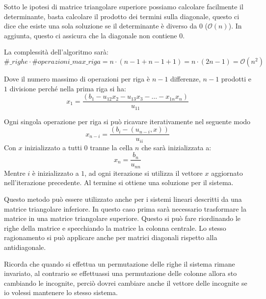 Sotto le ipotesi di matrice triangolare superiore possiamo calcolare facilmente
il determinante, basta calcolare il prodotto dei termini sulla diagonale, questo
ci dice che esiste una sola soluzione se il determinante è diverso da $0$
($\mathcal{O}(n)$). In aggiunta, questo ci assicura che la diagonale non contiene $0$.

La complessità dell'algoritmo sarà:
\begin{equation*}
    \#\_righe \cdot \#operazioni\_max\_riga = n \cdot (n - 1 + n - 1 + 1) = n
    \cdot (2n - 1) = \mathcal{O}(n^2)
\end{equation*}
\begin{nota}
    Dove il numero massimo di operazioni per riga è $n - 1$ differenze, $n - 1$
    prodotti e $1$ divisione perché nella prima riga si ha:
    \begin{equation*}
        x_1 = \frac{(b_1 - u_{12} x_2 - u_{13}x_3 - \dots - x_{1n} x_n)}{u_{11}}
    \end{equation*}
\end{nota}
Ogni singola operazione per riga si può ricavare iterativamente nel seguente modo
\begin{equation*}
    x_{n-i} = \frac{(b_i-(u_{n-i},x))}{u_{ii}}
\end{equation*}
Con $x$ inizializzato a tutti $0$ tranne la cella $n$ che sarà inizializzata a:
\begin{equation*}
    x_n = \frac{b_n}{u_{nn}}
\end{equation*}
Mentre $i$ è inizializzato a $1$, ad ogni iterazione si utilizza il vettore $x$
aggiornato nell'iterazione precedente. Al termine si ottiene una soluzione per il
sistema.
\begin{nota}
    Questo metodo può essere utilizzato anche per i sistemi lineari descritti da
    una matrice triangolare inferiore. In questo caso prima sarà necessario
    trasformare la matrice in una matrice triangolare superiore. Questo si può
    fare riordinando le righe della matrice e specchiando la matrice la colonna
    centrale. Lo stesso ragionamento si può applicare anche per matrici diagonali
    rispetto alla antidiagonale.
\end{nota}
\begin{nota}
    Ricorda che quando si effettua un permutazione delle righe il sistema rimane
    invariato, al contrario se effettuassi una permutazione delle colonne allora
    sto cambiando le incognite, perciò dovrei cambiare anche il vettore delle
    incognite se io volessi mantenere lo stesso sistema.
\end{nota}
